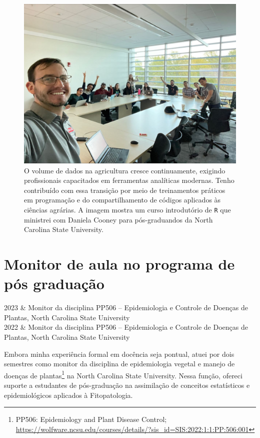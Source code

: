 \documentclass[12pt,a4paper,oneside]{book}
\newcommand{\NCState}{North Carolina State University}
\newcommand{\HeroFigPad}{\vspace{-1cm}}
\begin{document}
\begin{figure}[h]
\HeroFigPad
\begin{center}
\includegraphics[width=\textwidth]{images/cursoR.jpg}
\end{center}
\caption{
  O volume de dados na agricultura cresce continuamente, exigindo profissionais capacitados em 
  ferramentas analíticas modernas. Tenho contribuído com essa transição por meio de treinamentos 
  práticos em programação e do compartilhamento de códigos aplicados às ciências agrárias. A imagem 
  mostra um curso introdutório de \texttt{R} que ministrei com Daniela Cooney para pós-graduandos da \NCState{}.}
\label{fig_cursoR}
\end{figure}


\section{Monitor de aula no programa de pós graduação}
\begin{subsummarybox}[frametitle=\faFilePdf{}\quad Resumo das atividades]
\begin{datelist}
2023 & Monitor da disciplina PP506 – Epidemiologia e Controle de Doenças de Plantas, North Carolina State University \\
2022 & Monitor da disciplina PP506 – Epidemiologia e Controle de Doenças de Plantas, North Carolina State University
\end{datelist}
\end{subsummarybox}

Embora minha experiência formal em docência seja pontual, atuei por dois semestres como monitor da disciplina
de epidemiologia vegetal e manejo de doenças de 
plantas\footnote{PP506: Epidemiology and Plant Disease Control; \url{https://wolfware.ncsu.edu/courses/details/?sis_id=SIS:2022:1:1:PP:506:001}} 
na \NCState{}. Nessa função, ofereci suporte a estudantes de pós-graduação na assimilação de conceitos 
estatísticos e epidemiológicos aplicados à Fitopatologia.
\end{document}
